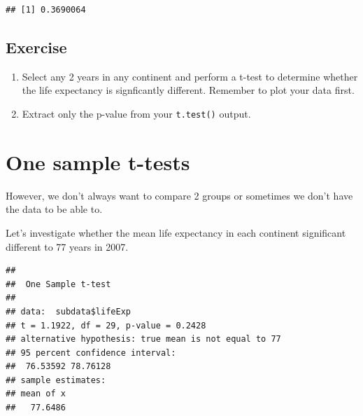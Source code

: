 \documentclass[]{book}
\makeatletter
\newenvironment{Shaded}{\begin{snugshade}}{\end{snugshade}}
\newcommand{\CommentTok}[1]{\textcolor[rgb]{0.56,0.35,0.01}{\textit{#1}}}
\newcommand{\DataTypeTok}[1]{\textcolor[rgb]{0.13,0.29,0.53}{#1}}
\newcommand{\DecValTok}[1]{\textcolor[rgb]{0.00,0.00,0.81}{#1}}
\newcommand{\KeywordTok}[1]{\textcolor[rgb]{0.13,0.29,0.53}{\textbf{#1}}}
\newcommand{\NormalTok}[1]{#1}
\newcommand{\OperatorTok}[1]{\textcolor[rgb]{0.81,0.36,0.00}{\textbf{#1}}}
\newcommand{\StringTok}[1]{\textcolor[rgb]{0.31,0.60,0.02}{#1}}
\newenvironment{kframe}{%
\medskip{}
\setlength{\fboxsep}{.8em}
 \def\at@end@of@kframe{}%
 \ifinner\ifhmode%
  \def\at@end@of@kframe{\end{minipage}}%
  \begin{minipage}{\columnwidth}%
 \fi\fi%
 \def\FrameCommand##1{\hskip\@totalleftmargin \hskip-\fboxsep
 \colorbox{shadecolor}{##1}\hskip-\fboxsep
     \hskip-\linewidth \hskip-\@totalleftmargin \hskip\columnwidth}%
 \MakeFramed {\advance\hsize-\width
   \@totalleftmargin\z@ \linewidth\hsize
   \@setminipage}}%
 {\par\unskip\endMakeFramed%
 \at@end@of@kframe}
\renewenvironment{Shaded}{\begin{kframe}}{\end{kframe}}
\theoremstyle{definition}
\theoremstyle{definition}
\theoremstyle{definition}
\theoremstyle{remark}
\makeatother
\begin{document}
\begin{verbatim}
## [1] 0.3690064
\end{verbatim}

\hypertarget{exercise-25}{%
\subsection{Exercise}\label{exercise-25}}

\begin{enumerate}
\def\labelenumi{\arabic{enumi}.}
\item
  Select any 2 years in any continent and perform a t-test to determine
  whether the life expectancy is signficantly different. Remember to
  plot your data first.
\item
  Extract only the p-value from your \texttt{t.test()} output.
\end{enumerate}

\hypertarget{one-sample-t-tests}{%
\section{One sample t-tests}\label{one-sample-t-tests}}

However, we don't always want to compare 2 groups or sometimes we don't
have the data to be able to.

Let's investigate whether the mean life expectancy in each continent
significant different to 77 years in 2007.

\begin{Shaded}
\end{Shaded}

\begin{verbatim}
## 
##  One Sample t-test
## 
## data:  subdata$lifeExp
## t = 1.1922, df = 29, p-value = 0.2428
## alternative hypothesis: true mean is not equal to 77
## 95 percent confidence interval:
##  76.53592 78.76128
## sample estimates:
## mean of x 
##   77.6486
\end{verbatim}
\end{document}
